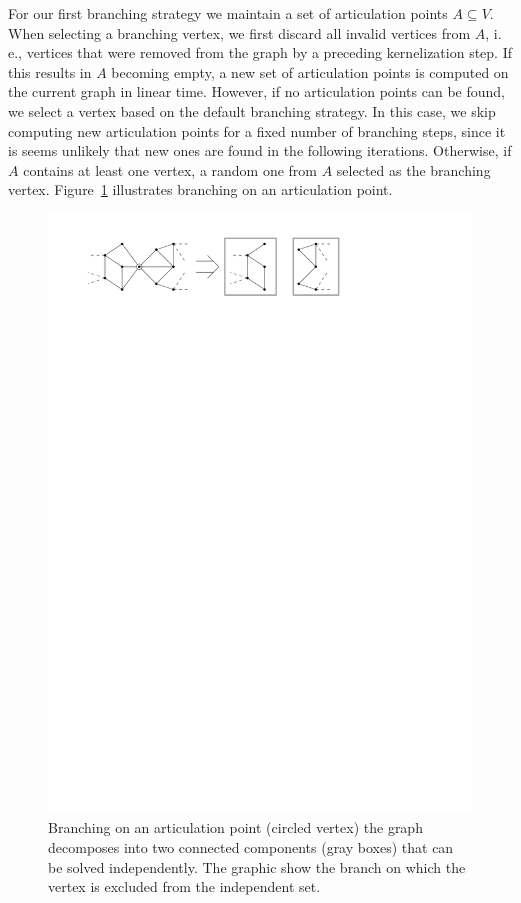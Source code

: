 \documentclass[a4paper,UKenglish,cleveref, autoref, thm-restate]{lipics-v2021}
\newcommand{\ie}{i.\,e.,\xspace}
\begin{document}
For our first branching strategy we maintain a set of articulation points $A \subseteq V$.
When selecting a branching vertex, we first discard all invalid vertices from $A$, \ie vertices that were removed from the graph by a preceding kernelization step.
If this results in $A$ becoming empty, a new set of articulation points is computed on the current graph in linear time.
However, if no articulation points can be found, we select a vertex based on the default branching strategy.
In this case, we skip computing new articulation points for a fixed number of branching steps, since it is seems unlikely that new ones are found in the following iterations.
Otherwise, if $A$ contains at least one vertex, a random one from $A$ selected as the branching
vertex. Figure~\ref{fig:articulation_points} illustrates branching on an
articulation point.

\begin{figure}[t]
  \centering
  \includegraphics[scale=1]{figures/articulation_points}
  \caption{Branching on an articulation point (circled vertex) the
    graph decomposes into two connected components (gray boxes) that can be
    solved independently. The graphic show the branch on which the vertex is
    excluded from the independent set.}
  \label{fig:articulation_points}
\end{figure}
\end{document}
